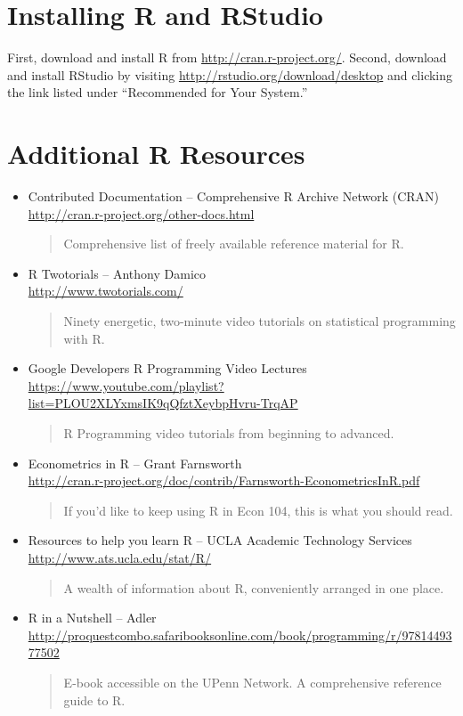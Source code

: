 \documentclass[11pt, letterpaper]{article}
\begin{document}
\section*{Installing R and RStudio} First, download and install R from \url{http://cran.r-project.org/}. Second, download and install RStudio by visiting \url{http://rstudio.org/download/desktop} and clicking the link listed under ``Recommended for Your System.'' 


\section*{Additional R Resources} 
\begin{itemize}
		       \item Contributed Documentation -- Comprehensive R Archive Network (CRAN) \\\url{http://cran.r-project.org/other-docs.html}
           	\begin{quote}
           		Comprehensive list of freely available reference material for R.
           	\end{quote}
\item R Twotorials -- Anthony Damico \\\url{http://www.twotorials.com/}
		\begin{quote}
		Ninety energetic, two-minute video tutorials on statistical programming with R. 
		\end{quote}
			\item Google Developers R Programming Video Lectures\\ \url{https://www.youtube.com/playlist?list=PLOU2XLYxmsIK9qQfztXeybpHvru-TrqAP}\begin{quote}R Programming video tutorials from beginning to advanced. \end{quote}
		 	\item Econometrics in R -- Grant Farnsworth\\\url{http://cran.r-project.org/doc/contrib/Farnsworth-EconometricsInR.pdf}
 		\begin{quote}
 		If you'd like to keep using R in Econ 104, this is what you should read.
 		\end{quote}
 			\item Resources to help you learn R -- UCLA Academic Technology Services \\\url{http://www.ats.ucla.edu/stat/R/}
		\begin{quote}
			A wealth of information about R, conveniently arranged in one place.
		\end{quote}
	           \item R in a Nutshell -- Adler\\ \url{http://proquestcombo.safaribooksonline.com/book/programming/r/9781449377502}         
           	\begin{quote}
           		E-book accessible on the UPenn Network. A comprehensive reference guide to R.
           	\end{quote}
\end{itemize}
\end{document}
